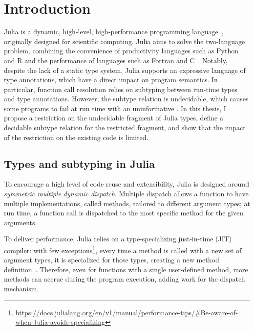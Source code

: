 \chapter{Introduction}

Julia is a dynamic, high-level, high-performance programming
language~\cite{bib:bezanson:julia-fresh:2017},
originally designed for scientific computing.
Julia aims to solve the two-language problem, combining the convenience of
productivity languages such as Python and R and the performance of languages
such as Fortran and C~\cite{bib:bezanson:julia-dyn-perf:oopsla:2018}.
Notably, despite the lack of a static type system,
Julia supports an expressive language of type annotations, which have a direct 
impact on program semantics. In particular, function call resolution relies on 
subtyping between run-time types and type annotations.
However, the subtype relation is undecidable, which causes some programs to
fail at run time with an uninformative .
In this thesis, I propose a restriction on the undecidable fragment of
Julia types, define a decidable subtype relation for the restricted fragment,
and show that the impact of the restriction on the existing code is limited.


\section{Types and subtyping in Julia}

To encourage a high level of code reuse and extensibility,
Julia is designed around \emph{symmetric multiple dynamic dispatch}.
Multiple dispatch allows a function to have multiple implementations, called
methods, tailored to different argument types; at run time, a function
call is dispatched to the most specific method for the given arguments.

To deliver performance, Julia relies on a type-specializing just-in-time (JIT)
compiler: with few exceptions\footnote{%
\url{https://docs.julialang.org/en/v1/manual/performance-tips/\#Be-aware-of-when-Julia-avoids-specializing}
}, %
every time a method is called with a new set of argument types,
it is specialized for those types, creating a new method
definition~\cite{bib:pelenitsyn:type-stability:oopsla:2021}.
Therefore, even for functions with a single user-defined method,
more methods can accrue during the program execution,
adding work for the dispatch mechanism.

